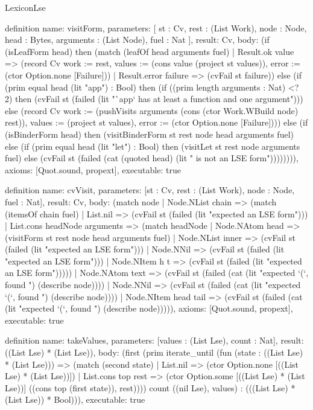 \begin{lexlean}{LexiconLse}
\begin{semanticmodule}
definition{
  name: visitForm,
  parameters: [
    st : Cv,
    rest : (List Work),
    node : Node,
    head : Bytes,
    arguments : (List Node),
    fuel : Nat
  ],
  result: Cv,
  body: (if (isLeafForm head) then (match (leafOf head arguments fuel)
    | Result.ok value => (record Cv {work := rest, values := (cons value (project st values)), error := (ctor Option.none [Failure])})
    | Result.error failure => (cvFail st failure)) else (if (prim equal head (lit "app") : Bool) then (if ((prim length arguments : Nat) <? 2) then (cvFail st (failed (lit "`app` has at least a function and one argument"))) else (record Cv {work := (pushVisits arguments (cons (ctor Work.WBuild node) rest)), values := (project st values), error := (ctor Option.none [Failure])})) else (if (isBinderForm head) then (visitBinderForm st rest node head arguments fuel) else (if (prim equal head (lit "let") : Bool) then (visitLet st rest node arguments fuel) else (cvFail st (failed (cat (quoted head) (lit " is not an LSE form")))))))),
  axioms: [Quot.sound, propext],
  executable: true
}

definition{
  name: cvVisit,
  parameters: [st : Cv, rest : (List Work), node : Node, fuel : Nat],
  result: Cv,
  body: (match node
    | Node.NList chain => (match (itemsOf chain fuel)
      | List.nil => (cvFail st (failed (lit "expected an LSE form")))
      | List.cons headNode arguments => (match headNode
        | Node.NAtom head => (visitForm st rest node head arguments fuel)
        | Node.NList inner => (cvFail st (failed (lit "expected an LSE form")))
        | Node.NNil => (cvFail st (failed (lit "expected an LSE form")))
        | Node.NItem h t => (cvFail st (failed (lit "expected an LSE form")))))
    | Node.NAtom text => (cvFail st (failed (cat (lit "expected `(`, found ") (describe node))))
    | Node.NNil => (cvFail st (failed (cat (lit "expected `(`, found ") (describe node))))
    | Node.NItem head tail => (cvFail st (failed (cat (lit "expected `(`, found ") (describe node))))),
  axioms: [Quot.sound, propext],
  executable: true
}

definition{
  name: takeValues,
  parameters: [values : (List Lse), count : Nat],
  result: ((List Lse) * (List Lse)),
  body: (first (prim iterate_until (fun (state : ((List Lse) * (List Lse))) => (match (second state)
    | List.nil => (ctor Option.none [((List Lse) * (List Lse))])
    | List.cons top rest => (ctor Option.some [((List Lse) * (List Lse))] ((cons top (first state)), rest)))) count ((nil Lse), values) : (((List Lse) * (List Lse)) * Bool))),
  executable: true
}


\end{semanticmodule}
\end{lexlean}
